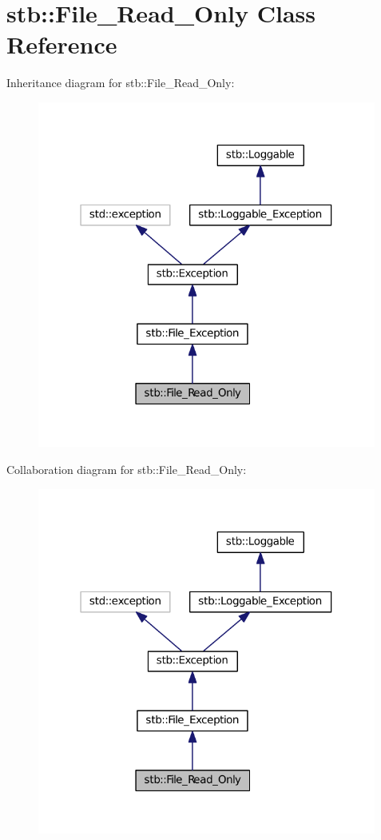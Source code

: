 \hypertarget{classstb_1_1File__Read__Only}{\section{stb\+:\+:File\+\_\+\+Read\+\_\+\+Only Class Reference}
\label{classstb_1_1File__Read__Only}
}


Inheritance diagram for stb\+:\+:File\+\_\+\+Read\+\_\+\+Only\+:
\nopagebreak
\begin{figure}[H]
\begin{center}
\leavevmode
\includegraphics[width=316pt]{classstb_1_1File__Read__Only__inherit__graph}
\end{center}
\end{figure}


Collaboration diagram for stb\+:\+:File\+\_\+\+Read\+\_\+\+Only\+:
\nopagebreak
\begin{figure}[H]
\begin{center}
\leavevmode
\includegraphics[width=316pt]{classstb_1_1File__Read__Only__coll__graph}
\end{center}
\end{figure}
